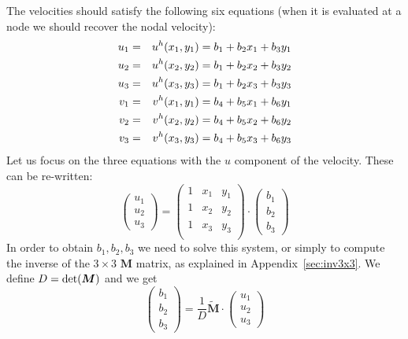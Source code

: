 The velocities should satisfy the following six equations (when it is evaluated at a node we should 
recover the nodal velocity):
\begin{eqnarray}
u_1 &=& u^h(x_1,y_1)= b_1 + b_2x_1+b_3y_1 \nonumber\\
u_2 &=& u^h(x_2,y_2)= b_1 + b_2x_2+b_3y_2 \nonumber\\
u_3 &=& u^h(x_3,y_3)= b_1 + b_2x_3+b_3y_3 \nonumber\\
v_1 &=& v^h(x_1,y_1)= b_4 + b_5x_1+b_6y_1 \nonumber\\
v_2 &=& v^h(x_2,y_2)= b_4 + b_5x_2+b_6y_2 \nonumber\\
v_3 &=& v^h(x_3,y_3)= b_4 + b_5x_3+b_6y_3 \nonumber
\end{eqnarray}
Let us focus on the three equations with the $u$ component of the velocity.
These can be re-written:
\[
\left(
\begin{array}{c}
u_1 \\ u_2 \\ u_3  
\end{array}
\right)
=
\left(
\begin{array}{ccc}
1 & x_1 & y_1 \\
1 & x_2 & y_2 \\
1 & x_3 & y_3 \\
\end{array}
\right)
\cdot
\left(
\begin{array}{c}
b_1 \\ b_2 \\ b_3  
\end{array}
\right)
\]
In order to obtain $b_1,b_2,b_3$ we need to solve this system, or simply to compute the
inverse of the $3\times 3$ ${\bm M}$ matrix, as explained in Appendix~\ref{sec:inv3x3}.
We define $D={\rm det}({\bm M})$ and we get
\[
\left(
\begin{array}{c}
b_1 \\ b_2 \\ b_3  
\end{array}
\right)
=
\frac{1}{D}
\tilde{\bm M}
\cdot
\left(
\begin{array}{c}
u_1 \\ u_2 \\ u_3  
\end{array}
\right)
\]
